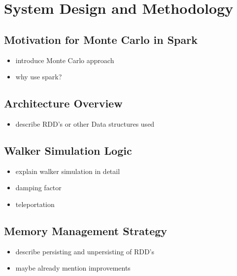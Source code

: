 \section{System Design and Methodology}
\subsection{Motivation for Monte Carlo in Spark}
\begin{itemize}
    \item introduce Monte Carlo approach
    \item why use spark?
\end{itemize}

\subsection{Architecture Overview}
\begin{itemize}
    \item describe RDD's or other Data structures used
\end{itemize}

\subsection{Walker Simulation Logic}
\begin{itemize}
    \item explain walker simulation in detail
    \item damping factor
    \item teleportation
\end{itemize}

\subsection{Memory Management Strategy}
\begin{itemize}
    \item describe persisting and unpersisting of RDD's
    \item maybe already mention improvements
\end{itemize}
